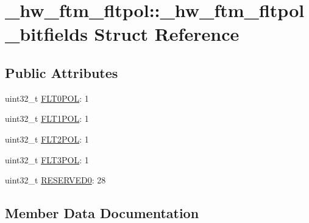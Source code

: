 \hypertarget{struct__hw__ftm__fltpol_1_1__hw__ftm__fltpol__bitfields}{}\section{\+\_\+hw\+\_\+ftm\+\_\+fltpol\+:\+:\+\_\+hw\+\_\+ftm\+\_\+fltpol\+\_\+bitfields Struct Reference}
\label{struct__hw__ftm__fltpol_1_1__hw__ftm__fltpol__bitfields}
\subsection*{Public Attributes}
\begin{DoxyCompactItemize}
\item 
uint32\+\_\+t \hyperlink{struct__hw__ftm__fltpol_1_1__hw__ftm__fltpol__bitfields_abcab9723a7e5453307c27d61e71e8994}{F\+L\+T0\+P\+OL}\+: 1
\item 
uint32\+\_\+t \hyperlink{struct__hw__ftm__fltpol_1_1__hw__ftm__fltpol__bitfields_ac2299c378995f079c081d90ce05f148b}{F\+L\+T1\+P\+OL}\+: 1
\item 
uint32\+\_\+t \hyperlink{struct__hw__ftm__fltpol_1_1__hw__ftm__fltpol__bitfields_a99bb1a0f517db593a36d24166ed71ed8}{F\+L\+T2\+P\+OL}\+: 1
\item 
uint32\+\_\+t \hyperlink{struct__hw__ftm__fltpol_1_1__hw__ftm__fltpol__bitfields_ade6c79f3006c4cade0516fc10b889090}{F\+L\+T3\+P\+OL}\+: 1
\item 
uint32\+\_\+t \hyperlink{struct__hw__ftm__fltpol_1_1__hw__ftm__fltpol__bitfields_a159b7c02bde0d47f2186137e05b84b39}{R\+E\+S\+E\+R\+V\+E\+D0}\+: 28
\end{DoxyCompactItemize}


\subsection{Member Data Documentation}
